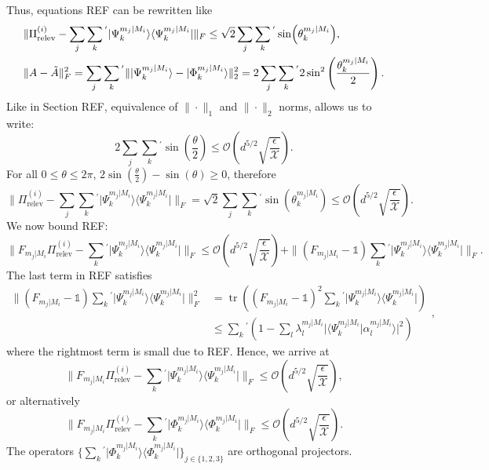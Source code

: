 Thus, equations REF can be rewritten like
\begin{align}
& \|\Pi_{\text{relev}}^{(i)}-\sum_j\sum_k{}^{'}\vert \Psi_k^{m_j\vert M_i}\rangle \langle \Psi_k^{m_j\vert M_i}\vert \|_F\leq\sqrt{2}\sum_j\sum_k{}^{'}\sin(\theta_k^{m_j\vert M_i}), \\
& \|A-\Tilde{A}\|_F^2=\sum_j\sum_k{}^{'}\|\vert \Psi_k^{m_j\vert M_i} \rangle - \vert \Phi_k^{m_j\vert M_i}\rangle\|_2^2=2\sum_j\sum_k{}^{'}2\sin^2\left(\frac{\theta_k^{m_j\vert M_i}}{2}\right).
\end{align}
Like in Section REF, equivalence of $\|\cdot\|_1$ and $\|\cdot\|_2$ norms, allows us to write:
\begin{equation}
2\sum_j\sum_k{}^{'}\sin\left(\frac{\theta}{2}\right)\leq \mathcal{O}\left(d^{5/2}\sqrt{\frac{\epsilon}{\mathcal{X}}}\right).
\end{equation}
For all $0\leq \theta \leq 2\pi$, $2\sin(\frac{\theta}{2})-\sin(\theta)\geq 0$, therefore
\begin{equation}
\|\Pi_{\text{relev}}^{(i)}-\sum_j\sum_k{}^{'}\vert \Psi_k^{m_j\vert M_i}\rangle \langle \Psi_k^{m_j\vert M_i}\vert \|_F = \sqrt{2}\sum_j\sum_k{}^{'}\sin(\theta_k^{m_j\vert M_i})\leq\mathcal{O}\left(d^{5/2}\sqrt{\frac{\epsilon}{\mathcal{X}}}\right).
\end{equation}
We now bound REF:
\begin{equation}
\|F_{m_j\vert M_i}\Pi_{\text{relev}}^{(i)}-\sum_{k}{}^{'}\vert \Psi_k^{m_j\vert M_i}\rangle \langle \Psi_k^{m_j\vert M_i}\vert \|_F \leq \mathcal{O}\left(d^{5/2}\sqrt{\frac{\epsilon}{\mathcal{X}}}\right)+\|(F_{m_j\vert M_i}-\mathbb{1})\sum_k{}^{'}\vert \Psi_k^{m_j\vert M_i} \rangle \langle \Psi_k^{m_j\vert M_i} \vert \|_F.
\end{equation}
The last term in REF satisfies
\begin{equation}
\begin{split}
\|(F_{m_j\vert M_i}-\mathbb{1})\sum_k{}^{'}\vert \Psi_k^{m_j\vert M_i} \rangle \langle \Psi_k^{m_j\vert M_i} \vert \|_F^2 & =\operatorname{tr}((F_{m_j\vert M_i}-\mathbb{1})^2\sum_k{}^{'}\vert \Psi_k^{m_j\vert M_i} \rangle \langle \Psi_k^{m_j\vert M_i} \vert) \\
& \leq \sum_k{}^{'}(1-\sum_l \lambda_l^{m_j\vert M_i}\vert \langle \Psi_k^{m_j\vert M_i}\vert \alpha_l^{m_j\vert M_i}\rangle \vert ^2)
\end{split},
\end{equation}
where the rightmost term is small due to REF. Hence, we arrive at
\begin{equation}
\|F_{m_j\vert M_i}\Pi_{\text{relev}}^{(i)}-\sum_{k}{}^{'}\vert \Psi_k^{m_j\vert M_i}\rangle \langle \Psi_k^{m_j\vert M_i}\vert \|_F \leq \mathcal{O}\left(d^{5/2}\sqrt{\frac{\epsilon}{\mathcal{X}}}\right),
\end{equation}
or alternatively
\begin{equation}
\|F_{m_j\vert M_i}\Pi_{\text{relev}}^{(i)}-\sum_{k}{}^{'}\vert \Phi_k^{m_j\vert M_i}\rangle \langle \Phi_k^{m_j\vert M_i}\vert \|_F \leq \mathcal{O}\left(d^{5/2}\sqrt{\frac{\epsilon}{\mathcal{X}}}\right).
\end{equation}
The operators $\{\sum_{k}{}^{'}\vert \Phi_k^{m_j\vert M_i}\rangle \langle \Phi_k^{m_j\vert M_i}\vert\}_{j\in\{1,2,3\}}$ are orthogonal projectors.

